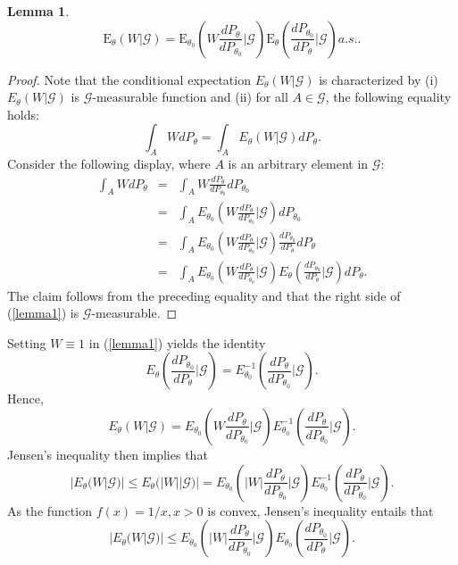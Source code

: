\documentclass[a4paper,12pt]{article}
\newcommand{\E}{\mathop{\mathbb{E}}}
\def \E{\mbox{E}}
\def \G {\mathcal{G}}
\newtheorem{lemma}[theorem]{Lemma}
\begin{document}
\begin{lemma}
\begin{equation}
\E_\theta(W|\G)=\E_{\theta_0}\left(W\frac{dP_{\theta}}{dP_{\theta_0}}|\G\right)\E_{\theta}\left(\frac{dP_{\theta_0}}{dP_{\theta}}|\G\right) a.s.. 
\label{lemma1}
\end{equation}
\end{lemma} 
\begin{proof}
Note that the conditional expectation $E_\theta(W|\G)$ is characterized by  (i) $E_\theta(W|\G)$ is $\G$-measurable function and (ii) for all $A\in\G$, the following equality holds:
$$
\int_A W dP_\theta=\int_A E_\theta(W|\G) dP_\theta.
$$
Consider the following display, where $A$ is an arbitrary element in $\G$:
\begin{eqnarray*}
\int_A W dP_\theta &=&\int_A W  \frac{dP_{\theta}}{dP_{\theta_0}} dP_{\theta_0} \\
&=& \int_A  E_{\theta_0} \left(W\frac{dP_{\theta}}{dP_{\theta_0}}|\G\right) dP_{\theta_0}
\\
&=& \int_A  E_{\theta_0} \left(W\frac{dP_{\theta}}{dP_{\theta_0}}|\G\right) \frac{dP_{\theta_0}}{dP_{\theta}} dP_{\theta} \\
&=& \int_A  E_{\theta_0} \left(W\frac{dP_{\theta}}{dP_{\theta_0}}|\G\right) E_\theta\left(\frac{dP_{\theta_0}}{dP_{\theta}}|\G\right) dP_{\theta}.
\end{eqnarray*} 
The claim follows from the preceding equality and that the right side of (\ref{lemma1}) is $\G$-measurable.
\end{proof}
Setting $W\equiv 1$ in (\ref{lemma1}) yields the 
identity 
$$
E_{\theta}\left(\frac{dP_{\theta_0}}{dP_{\theta}}|\G\right) = E^{-1}_{\theta_0}\left(\frac{dP_{\theta}}{dP_{\theta_0}}|\G\right).
$$
Hence, 
$$
E_\theta(W|\G)=E_{\theta_0}\left(W\frac{dP_{\theta}}{dP_{\theta_0}}|\G\right)E^{-1}_{\theta_0}\left(\frac{dP_{\theta}}{dP_{\theta_0}}|\G\right).
$$
Jensen's inequality then implies that 
$$
|E_\theta(W|\G)|\le E_\theta(|W||\G)| = E_{\theta_0}\left(|W|\frac{dP_{\theta}}{dP_{\theta_0}}|\G\right)E^{-1}_{\theta_0}\left(\frac{dP_{\theta}}{dP_{\theta_0}}|\G\right).
$$
As the function $f(x)=1/x, x>0$ is convex, Jensen's inequality entails that
\begin{equation}
|E_\theta(W|\G)|\le E_{\theta_0}\left(|W|\frac{dP_{\theta}}{dP_{\theta_0}}|\G\right)E_{\theta_0}\left(\frac{dP_{\theta_0}}{dP_{\theta}}|\G\right).
\label{ineq1}
\end{equation}
\end{document}
